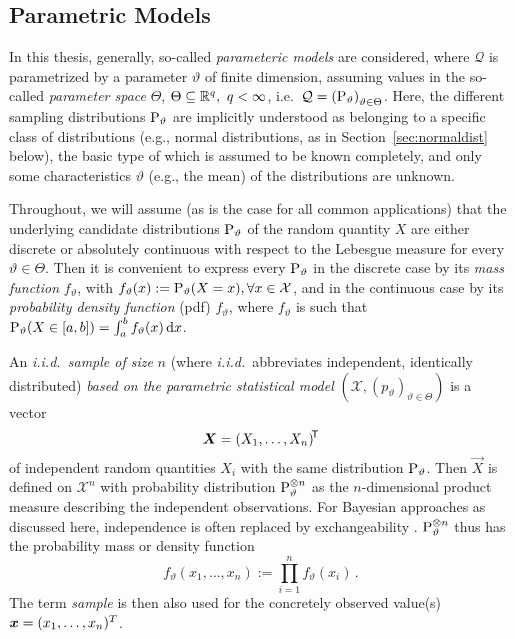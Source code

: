 \subsection{Parametric Models}
\label{sec:parametricmodels}

In this thesis, generally, so-called \emph{parameteric models} are considered,
where $\mathcal{Q}$ is pa\-ra\-me\-trized by a parameter $\vartheta$ of finite dimension,
assuming values in the so-called \emph{parameter space} $\Theta$, $\Theta \subseteq \mathbb{R}^q, \ q < \infty$,
i.e.\ ${\cal Q}=\left(\operatorname{P}_\vartheta\right)_{\vartheta \in \Theta}$.
Here, the different sampling distributions $\operatorname{P}_\vartheta$ are implicitly understood as belonging to a specific class of distributions
(e.g., normal distributions, as in Section~\ref{sec:normaldist} below),
the basic type of which is assumed to be known completely,
and only some characteristics $\vartheta$ (e.g., the mean) of the distributions are unknown.

Throughout, we will assume (as is the case for all common applications)
that the underlying candidate distributions $\operatorname{P}_\vartheta$ of the random quantity $X$
are either discrete or absolutely continuous with respect to the Lebesgue measure
\parencite[see, e.g., ][pp.~32f, 38 for some technical details]{1993:karr} for every $\vartheta \in \Theta$.
Then it is convenient to express every $\operatorname{P}_\vartheta$ in the discrete case by its \emph{mass function} $f_\vartheta$,
with $f_\vartheta(x):=\operatorname{P}_\vartheta(X=x),\forall x \in \mathcal{X}$,
and in the continuous case by its \emph{probability density function} (pdf) $f_\vartheta$,
where $f_\vartheta$ is such that $\operatorname{P}_\vartheta(X \in [a,b]) = \int_a^b f_\vartheta(x) \,\mathrm{d} x$.

An \emph{i.i.d.\ sample of size} $n$ (where \emph{i.i.d.}\ abbreviates independent, identically distributed)
\emph{based on the parametric statistical model} %
$(\mathcal{X}, (p_\vartheta)_{\vartheta \in \Theta})$ is a vector
\[
\vec{X} = (X_1, \ldots, X_n)^\tra %
\]
of independent random quantities $X_i$ with the same distribution $\operatorname{P}_\vartheta$.
Then $\vec{X}$ is defined on $\mathcal{X}^n$ with probability distribution $\operatorname{P}_\vartheta^{\otimes n}$
as the $n$-dimensional product measure describing the independent observations.
For Bayesian approaches as discussed here,
independence is often replaced by exchangeability \parencite[see, e.g.,][\S 4.2]{2000:bernardosmith}.
$\operatorname{P}_\vartheta^{\otimes n}$ thus has the probability mass or density function
\[
f_\vartheta(x_1, \ldots, x_n) := \prod_{i=1}^{n} f_\vartheta(x_i)\,.%
\]
The term \emph{sample} is then also used for the concretely observed value(s) ${\bm x}=(x_1, \ldots, x_n)^T$.%

